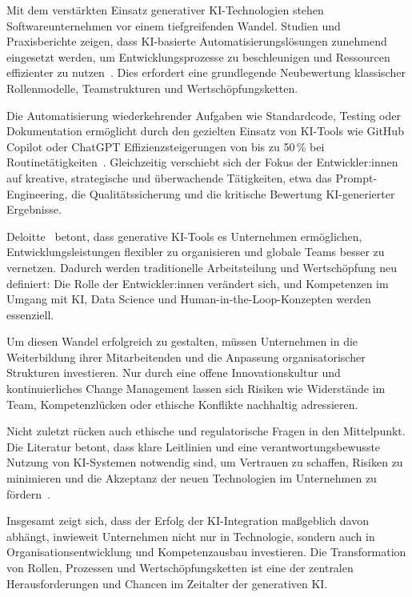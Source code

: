 Mit dem verstärkten Einsatz generativer KI-Technologien stehen
Softwareunternehmen vor einem tiefgreifenden Wandel. Studien und Praxisberichte
zeigen, dass KI-basierte Automatisierungslösungen zunehmend eingesetzt werden,
um Entwicklungsprozesse zu beschleunigen und Ressourcen effizienter zu
nutzen~\cite{siebert_generative_2024,braun_ki_2024}. Dies erfordert eine
grundlegende Neubewertung klassischer Rollenmodelle, Teamstrukturen und
Wertschöpfungsketten.

Die Automatisierung wiederkehrender Aufgaben wie Standardcode, Testing oder
Dokumentation ermöglicht durch den gezielten Einsatz von KI-Tools wie GitHub
Copilot oder ChatGPT Effizienzsteigerungen von bis zu 50\,\% bei
Routinetätigkeiten~\cite{braun_ki_2024,siebert_generative_2024}. Gleichzeitig
verschiebt sich der Fokus der Entwickler:innen auf kreative, strategische und
überwachende Tätigkeiten, etwa das Prompt-Engineering, die Qualitätssicherung
und die kritische Bewertung KI-generierter Ergebnisse.

Deloitte~\cite{deloitte_future_2024} betont, dass generative KI-Tools es
Unternehmen ermöglichen, Entwicklungsleistungen flexibler zu organisieren und
globale Teams besser zu vernetzen. Dadurch werden traditionelle Arbeitsteilung
und Wertschöpfung neu definiert: Die Rolle der Entwickler:innen verändert sich,
und Kompetenzen im Umgang mit KI, Data Science und Human-in-the-Loop-Konzepten
werden essenziell.

Um diesen Wandel erfolgreich zu gestalten, müssen Unternehmen in die
Weiterbildung ihrer Mitarbeitenden und die Anpassung organisatorischer
Strukturen investieren. Nur durch eine offene Innovationskultur und
kontinuierliches Change Management lassen sich Risiken wie Widerstände im Team,
Kompetenzlücken oder ethische Konflikte nachhaltig adressieren.

Nicht zuletzt rücken auch ethische und regulatorische Fragen in den
Mittelpunkt. Die Literatur betont, dass klare Leitlinien und eine
verantwortungsbewusste Nutzung von KI-Systemen notwendig sind, um Vertrauen zu
schaffen, Risiken zu minimieren und die Akzeptanz der neuen Technologien im
Unternehmen zu fördern~\cite{siebert_generative_2024}.

Insgesamt zeigt sich, dass der Erfolg der KI-Integration maßgeblich davon
abhängt, inwieweit Unternehmen nicht nur in Technologie, sondern auch in
Organisationsentwicklung und Kompetenzausbau investieren. Die Transformation
von Rollen, Prozessen und Wertschöpfungsketten ist eine der zentralen
Herausforderungen und Chancen im Zeitalter der generativen KI.

